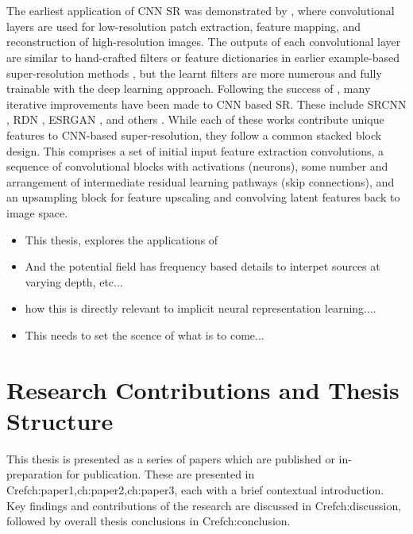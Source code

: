 \documentclass[manuscript.tex]{subfiles}
\begin{document}
\section{}
\label{sec:introgeoml}
The earliest application of CNN SR was demonstrated by \parencite{dongLearningDeepConvolutional2014}, where convolutional layers are used for low-resolution patch extraction, feature mapping, and reconstruction of high-resolution images.
The outputs of each convolutional layer are similar to hand-crafted filters or feature dictionaries in earlier example-based super-resolution methods \parencite{freemanExamplebasedSuperresolution2002}, but the learnt filters are more numerous and fully trainable with the deep learning approach.
Following the success of \parencite{dongLearningDeepConvolutional2014}, many iterative improvements have been made to CNN based SR\@.
These include SRCNN \parencite{dongImageSuperresolutionUsing2016}, RDN \parencite{zhangResidualDenseNetwork2018}, ESRGAN \parencite{wangESRGANEnhancedSuperresolution2018}, and others \parencite{ledigPhotorealisticSingleImage2017,limEnhancedDeepResidual2017}.
While each of these works contribute unique features to CNN-based super-resolution, they follow a common stacked block design.
This comprises a set of initial input feature extraction convolutions, a sequence of convolutional blocks with activations (neurons), some number and arrangement of intermediate residual learning pathways (skip connections), and an upsampling block for feature upscaling and convolving latent features back to image space.


\begin{itemize}
    \item This thesis, explores the applications of
    \item And the potential field has frequency based details to interpet sources at varying depth, etc...
    \item how this is directly relevant to implicit neural representation learning....
    \item This needs to set the scence of what is to come...
\end{itemize}    


\section{Research Contributions and Thesis Structure}
This thesis is presented as a series of papers which are published or in-preparation for publication.
These are presented in Cref{ch:paper1,ch:paper2,ch:paper3}, each with a brief contextual introduction.
Key findings and contributions of the research are discussed in Cref{ch:discussion}, followed by overall thesis conclusions in Cref{ch:conclusion}.
\end{document}
